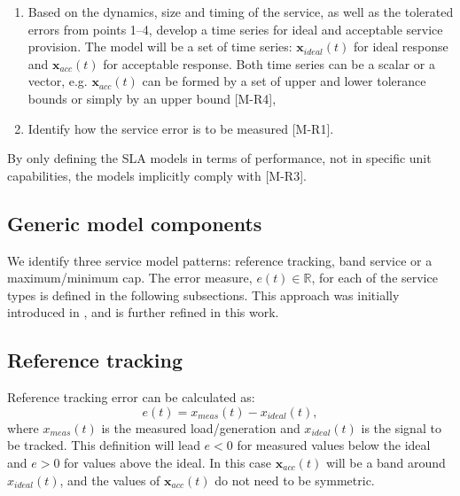 \begin{enumerate}
  \item Based on the dynamics, size and timing of the service, as well as the tolerated errors from points 1--4, develop a time series for ideal and acceptable service provision. The model will be a set of time series: $\mathbf{x}_{ideal}(t)$ for ideal response and $\mathbf{x}_{acc}(t)$ for acceptable response. Both time series can be a scalar or a vector, e.g. $\mathbf{x}_{acc}(t)$ can be formed by a set of upper and lower tolerance bounds or simply by an upper bound [M-R4],
  \item Identify how the service error is to be measured [M-R1].
\end{enumerate}

By only defining the SLA models in terms of performance, not in specific unit capabilities, the models implicitly comply with [M-R3].


\subsection{Generic model components}
We identify three service model patterns: reference tracking, band service or a maximum/minimum cap. The error measure, $e(t) \in \mathbb{R}$, for each of the service types is defined in the following subsections. This approach was initially introduced in \cite{bondy2014performance}, and is further refined in this work. 





\subsection*{Reference tracking}
Reference tracking error can be calculated as:
\begin{equation}\label{eq:TSGref_error}
e(t) = x_{meas}(t) - x_{ideal}(t),
\end{equation}
where $x_{meas}(t)$ is the measured load/generation and $x_{ideal}(t)$ is the signal to be tracked. This definition will lead $e<0$ for measured values below the ideal and $e>0$ for values above the ideal. In this case $\mathbf{x}_{acc}(t)$ will be a band around $x_{ideal}(t)$, and the values of $\mathbf{x}_{acc}(t)$ do not need to be symmetric.

